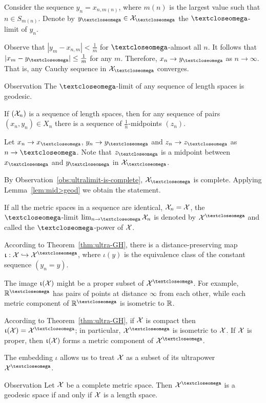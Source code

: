 Consider the sequence $y_n=x_{n,m(n)}$, where $m(n)$ is the largest value such that $n\in S_{m(n)}$.
Denote by $y_\o\in \spc{X}_\o$ the $\o$-limit of $y_n$.

Observe that $|y_m-x_{n,m}|<\tfrac1{m}$ for $\o$-almost all $n$.
It follows that $|x_m-y_\o|\le \tfrac1{m}$ for any $m$.
Therefore, $x_n\to y_\o$ as $n\to \infty$.
That is, any Cauchy sequence in $\spc{X}_\o$ converges.
\qeds


\begin{thm}{Observation}\label{obs:ultralimit-is-geodesic}
The $\o$-limit of any sequence of length spaces is geodesic. 
\end{thm}

If $(\mathcal{X}_n)$ is a sequence of length spaces, then for any sequence of pairs $(x_n, y_n)\in X_n$ there is a sequence of $\tfrac1n$-midpoints $(z_n)$.

Let $x_n\to x_\o$, $y_n\to y_\o$ and $z_n\to z_\o$ as $n\to \o$.
Note that $z_\o$ is a midpoint between $x_\o$ and $y_\o$ in $\spc{X}_\o$.

By Observation~\ref{obs:ultralimit-is-complete}, $\spc{X}_\o$ is complete.
Applying Lemma~\ref{lem:mid>geod} we obtain the statement.
\qeds

 If all the metric spaces in a sequence are identical, $\spc{X}_n\z=\spc{X}$, 
the $\o$-limit 
$\lim_{n\to\o}\spc{X}_n$
is denoted by $\spc{X}^\o$
and called the  $\o$-power of $\mathcal{X}$.
 
According to Theorem~\ref{thm:ultra-GH},
there is a distance-preserving map
$\iota:\spc{X}\hookrightarrow \spc{X}^\o$, where $\iota(y)$ is the equivalence class of the constant sequence $(y_n=y)$. 

The image $\upiota(\mathcal{X})$ might be a proper subset of $\spc{X}^\o$.
For example, $\RR^\o$ has pairs of points at distance $\infty$ from each other, while each metric component of $\RR^\o$ is isometric to $\mathbb{R}$.

According to Theorem~\ref{thm:ultra-GH}, 
if $\mathcal{X}$ is compact then $\iota(\spc{X})=\spc{X}^\o$;
in particular, $\spc{X}^\o$ is isometric to $\mathcal{X}$.
If $\mathcal{X}$ is proper, then $\upiota(\mathcal{X})$ forms a metric component of $\spc{X}^\o$.

The embedding $\iota$ allows us to treat $\mathcal{X}$ as a subset of its ultrapower $\spc{X}^\o$. 

\begin{thm}{Observation}\label{obs:ultrapower-is-geodesic}
Let $\mathcal{X}$ be a complete metric space. 
Then $\spc{X}^\o$ is a geodesic space if and only if $\mathcal{X}$ is a length space.
\end{thm}

